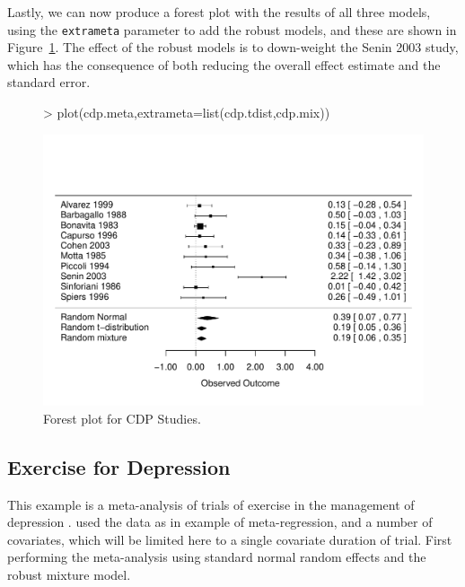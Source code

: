 \documentclass{article}
\begin{document}
Lastly, we can now produce a forest plot with the results of all three models, using the \texttt{extrameta} parameter to add the robust models, and these are shown in Figure~\ref{fig:forest2}. The effect of the robust models is to down-weight the Senin 2003 study, which has the consequence of both reducing the overall effect estimate and the standard error.

\begin{figure}
  \centering
\begin{Schunk}
\begin{Sinput}
> plot(cdp.meta,extrameta=list(cdp.tdist,cdp.mix))
\end{Sinput}
\end{Schunk}
\includegraphics{metaplus-examples-014}
  \caption{Forest plot for CDP Studies.}
  \label{fig:forest2}
\end{figure}

\subsection{Exercise for Depression}

This example is a meta-analysis of trials of exercise in the management of depression \cite{Lawlor2001}. \citep{Higgins2004} used the data as in example of meta-regression, and a number of covariates, which will be limited here to a single covariate duration of trial. First performing the meta-analysis using standard normal random effects and the robust mixture model. 
\end{document}
